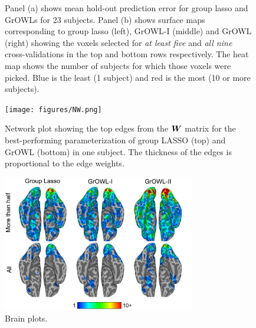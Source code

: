 \begin{figure}[!t]
\centering
{}
\hfil
{}
\caption{Panel (a) shows mean hold-out prediction error for group lasso and GrOWLs for 23 subjects. Panel (b) shows surface maps corresponding to group lasso (left), GrOWL-I (middle) and GrOWL (right) showing the voxels selected for \textit{at least five} and \textit{all nine} cross-validations in the top and bottom rows respectively. The heat map shows the number of subjects for which those voxels were picked. Blue is the least (1 subject) and red is the most (10 or more subjects).}
\label{fig.error}
\end{figure}

\begin{figure}[!t]
\centering
\texttt{[image: figures/NW.png]}%
\caption{Network plot showing the top edges from the $\boldsymbol{W}$ matrix for the best-performing parameterization of group LASSO (top) and GrOWL (bottom) in one subject. The thickness of the edges is proportional to the edge weights.}
\label{fig.NW}
\end{figure}


\iffalse
\begin{figure}[!t]
\centering
\includegraphics[width=0.75\textwidth]{figures/brain_final.png}%
\caption{Brain plots.}
\label{fig.brain}
\end{figure}

